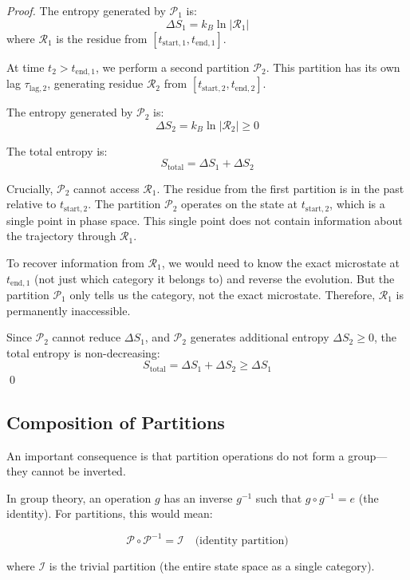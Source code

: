 \documentclass[twocolumn,10pt]{article}
\theoremstyle{definition}
\theoremstyle{remark}
\begin{document}
\begin{proof}
The entropy generated by $\mathcal{P}_1$ is:
$$
\Delta S_1 = k_B \ln |\mathcal{R}_1|
$$
where $\mathcal{R}_1$ is the residue from $[t_{\text{start},1}, t_{\text{end},1}]$.

At time $t_2 > t_{\text{end},1}$, we perform a second partition $\mathcal{P}_2$. This partition has its own lag $\tau_{\text{lag},2}$, generating residue $\mathcal{R}_2$ from $[t_{\text{start},2}, t_{\text{end},2}]$.

The entropy generated by $\mathcal{P}_2$ is:
$$
\Delta S_2 = k_B \ln |\mathcal{R}_2| \geq 0
$$

The total entropy is:
$$
S_{\text{total}} = \Delta S_1 + \Delta S_2
$$

Crucially, $\mathcal{P}_2$ cannot access $\mathcal{R}_1$. The residue from the first partition is in the past relative to $t_{\text{start},2}$. The partition $\mathcal{P}_2$ operates on the state at $t_{\text{start},2}$, which is a single point in phase space. This single point does not contain information about the trajectory through $\mathcal{R}_1$.

To recover information from $\mathcal{R}_1$, we would need to know the exact microstate at $t_{\text{end},1}$ (not just which category it belongs to) and reverse the evolution. But the partition $\mathcal{P}_1$ only tells us the category, not the exact microstate. Therefore, $\mathcal{R}_1$ is permanently inaccessible.

Since $\mathcal{P}_2$ cannot reduce $\Delta S_1$, and $\mathcal{P}_2$ generates additional entropy $\Delta S_2 \geq 0$, the total entropy is non-decreasing:
$$
S_{\text{total}} = \Delta S_1 + \Delta S_2 \geq \Delta S_1
$$
\qed
\end{proof}

\subsection{Composition of Partitions}

An important consequence is that partition operations do not form a group—they cannot be inverted.

In group theory, an operation $g$ has an inverse $g^{-1}$ such that $g \circ g^{-1} = e$ (the identity). For partitions, this would mean:

$$
\mathcal{P} \circ \mathcal{P}^{-1} = \mathcal{I} \quad \text{(identity partition)}
$$

where $\mathcal{I}$ is the trivial partition (the entire state space as a single category).
\end{document}

